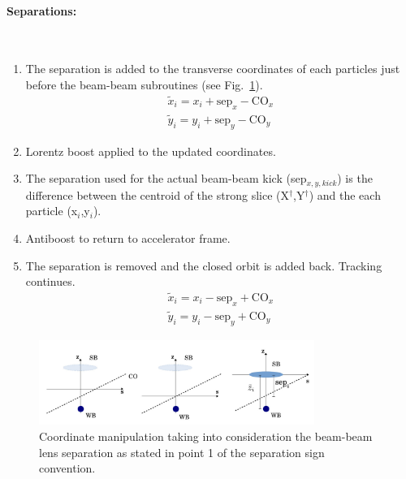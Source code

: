 \paragraph{Separations:}~\\
\begin{enumerate}
    \item The separation is added to the transverse coordinates of each particles just before the beam-beam subroutines (see Fig.~\ref{fig:BB_sep}).
        \begin{eqnarray*}
            \tilde x_{i} = x_{i} + \mathrm{sep}_{x} - \mathrm{CO}_{x} \\
            \tilde y_{i} = y_{i} + \mathrm{sep}_{y} - \mathrm{CO}_{y}
        \end{eqnarray*}
    \item Lorentz boost applied to the updated coordinates.
    \item The separation used for the actual beam-beam kick (sep$_{x,y,kick}$) is the difference between the centroid of the strong slice (X$^{\dag}$,Y$^{\dag}$) and the each particle (x$_i$,y$_i$).
    \item Antiboost to return to accelerator frame.
    \item The separation is removed and the closed orbit is added back. Tracking continues.
        \begin{eqnarray*}
            \tilde x_{i} = x_{i} - \mathrm{sep}_{x} + \mathrm{CO}_{x} \\
            \tilde y_{i} = y_{i} - \mathrm{sep}_{y} + \mathrm{CO}_{y}
        \end{eqnarray*}
\end{enumerate}
\begin{figure}[h]
    \begin{center}
    \includegraphics[width=0.8\textwidth]{figures/BB_sep}
    \caption{Coordinate manipulation taking into consideration the beam-beam lens separation as stated in point 1 of the separation sign convention.}
    \label{fig:BB_sep}
    \end{center}
\end{figure}

